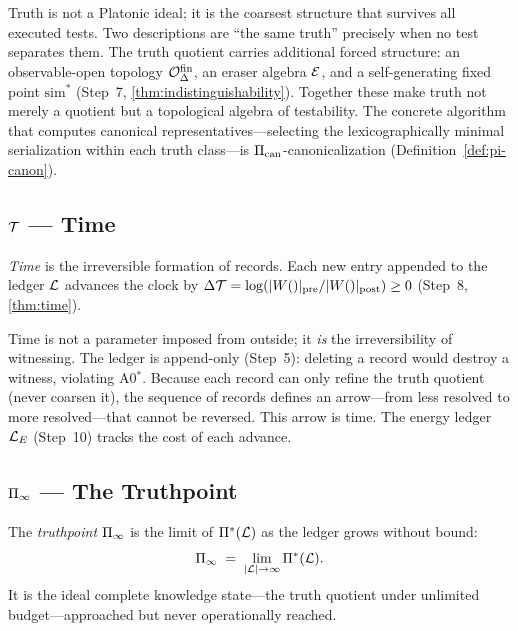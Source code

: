 Truth is not a Platonic ideal; it is the coarsest structure that survives
all executed tests.  Two descriptions are ``the same truth'' precisely when
no test separates them.  The truth quotient carries additional forced
structure: an observable-open topology $\mathcal{O}^{\mathrm{fin}}_\Delta$, an eraser algebra
$\mathcal{E}$, and a self-generating fixed point $\mathrm{sim}^*$ (Step~7,
\cref{thm:indistinguishability}).  Together these make truth not merely a
quotient but a topological algebra of testability.
The concrete algorithm that computes canonical representatives---selecting the lexicographically minimal serialization within each truth class---is $\Pi_{\mathrm{can}}$-canonicalization (Definition~\ref{def:pi-canon}).

\subsection{$\mathcal{T}$ --- Time}
\label{sec:primitives:time}

\begin{definition}[Time]
\label{def:prim-time}
\emph{Time} is the irreversible formation of records.  Each new entry
appended to the ledger $\mathcal{L}$ advances the clock by
$\Delta\mathcal{T} = \log(|W()|_{\mathrm{pre}} / |W()|_{\mathrm{post}})
\geq 0$ (Step~8, \cref{thm:time}).
\end{definition}

Time is not a parameter imposed from outside; it \emph{is} the
irreversibility of witnessing.  The ledger is append-only (Step~5): deleting
a record would destroy a witness, violating A0$^*$.  Because each record can
only refine the truth quotient (never coarsen it), the sequence of records
defines an arrow---from less resolved to more resolved---that cannot be
reversed.  This arrow is time.  The energy ledger $\mathcal{L}_E$ (Step~10)
tracks the cost of each advance.

\subsection{$\Pi_\infty$ --- The Truthpoint}
\label{sec:primitives:truthpoint}

\begin{definition}[Truthpoint]
\label{def:truthpoint}
The \emph{truthpoint} $\Pi_\infty$ is the limit of $\Pi^*(\mathcal{L})$ as the
ledger grows without bound:
\[
  \Pi_\infty \;=\; \lim_{|\mathcal{L}| \to \infty} \Pi^*(\mathcal{L}).
\]
It is the ideal complete knowledge state---the truth quotient under
unlimited budget---approached but never operationally reached.
\end{definition}

